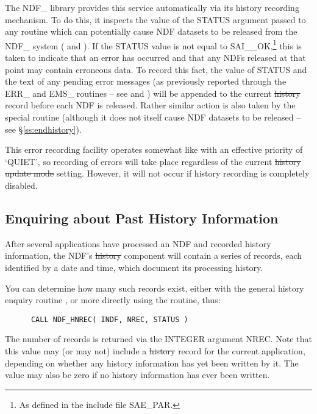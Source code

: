 The NDF\_ library provides this service automatically via its history
recording mechanism. To do this, it inspects the value of the STATUS
argument passed to any routine which can potentially cause NDF
datasets to be released from the NDF\_ system ( and
).  If the STATUS value is not equal to SAI\_\_OK,\footnote{As
defined in the include file SAE\_PAR.} this is taken to indicate that
an error has occurred and that any NDFs released at that point may
contain erroneous data. To record this fact, the value of STATUS and
the text of any pending error messages (as previously reported through
the ERR\_ and EMS\_ routines -- see  and
) will be appended to the current \st{history\/}
record before
each NDF is released.  Rather similar action is also taken by the
special routine  (although it does not itself cause NDF
datasets to be released -- see \S\ref{ss:endhistory}).

This error recording facility operates somewhat like  with an
effective priority of `QUIET', so recording of errors will take place
regardless of the current \st{history update mode\/} setting.  However,
it will not occur if history recording is completely disabled.

\subsection{Enquiring about Past History Information}

After several applications have processed an NDF and recorded history
information, the NDF's \st{history\/} component will contain a series of
records, each identified by a date and time, which document its
processing history.

You can determine how many such records exist, either with the general
history enquiry routine , or more directly using the
 routine, thus:

\small
\begin{verbatim}
      CALL NDF_HNREC( INDF, NREC, STATUS )
\end{verbatim}
\normalsize

The number of records is returned via the INTEGER argument NREC. Note
that this value may (or may not) include a \st{history\/} record for
the current application, depending on whether any history information
has yet been written by it. The value may also be zero if no history
information has ever been written.

